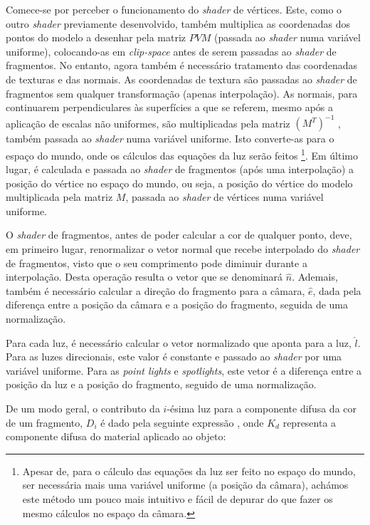 \documentclass[12pt, a4paper]{article}
\begin{document}
Comece-se por perceber o funcionamento do \emph{shader} de vértices. Este, como o outro
\emph{shader} previamente desenvolvido, também multiplica as coordenadas dos pontos do modelo a
desenhar pela matriz $PVM$ (passada ao \emph{shader} numa variável uniforme), colocando-as em
\emph{clip-space} antes de serem passadas ao \emph{shader} de fragmentos. No entanto, agora também é
necessário tratamento das coordenadas de texturas e das normais. As coordenadas de textura são
passadas ao \emph{shader} de fragmentos sem qualquer transformação (apenas interpolação). As
normais, para continuarem perpendiculares às superfícies a que se referem, mesmo após a aplicação de
escalas não uniformes, são multiplicadas pela matriz $(M^T)^{-1}$ \cite{learn-opengl-1}, também
passada ao \emph{shader} numa variável uniforme. Isto converte-as para o espaço do mundo, onde os
cálculos das equações da luz serão feitos
\footnote{Apesar de, para o cálculo das equações da
luz ser feito no espaço do mundo, ser necessária mais uma variável uniforme (a posição da câmara),
achámos este método um pouco mais intuitivo e fácil de depurar do que fazer os mesmo cálculos no
espaço da câmara.}.
Em último lugar, é calculada e passada ao \emph{shader} de fragmentos (após uma interpolação) a
posição do vértice no espaço do mundo, ou seja, a posição do vértice do modelo multiplicada pela
matriz $M$, passada ao \emph{shader} de vértices numa variável uniforme.

O \emph{shader} de fragmentos, antes de poder calcular a cor de qualquer ponto, deve, em primeiro
lugar, renormalizar o vetor normal que recebe interpolado do \emph{shader} de fragmentos, visto que
o seu comprimento pode diminuir durante a interpolação. Desta operação resulta o vetor que se
denominará $\hat{n}$. Ademais, também é necessário calcular a direção do fragmento para a câmara,
$\hat{e}$, dada pela diferença entre a posição da câmara e a posição do fragmento, seguida de uma
normalização.

Para cada luz, é necessário calcular o vetor normalizado que aponta para a luz, $\hat{l}$. Para as
luzes direcionais, este valor é constante e passado ao \emph{shader} por uma variável uniforme. Para
as \emph{point lights} e \emph{spotlights}, este vetor é a diferença entre a posição da luz e a
posição do fragmento, seguido de uma normalização.

De um modo geral, o contributo da $i$-ésima luz para a componente difusa da cor de um fragmento,
$D_i$ é dado pela seguinte expressão \cite{learn-opengl-1}, onde $K_d$ representa a componente
difusa do material aplicado ao objeto:
\end{document}
